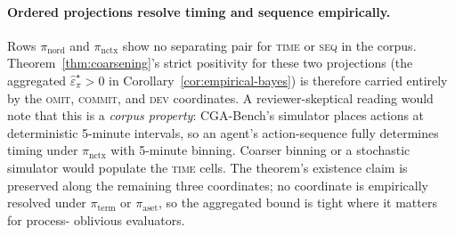 \paragraph{Ordered projections resolve timing and sequence
empirically.} Rows $\pi_{\mathrm{nord}}$ and $\pi_{\mathrm{nctx}}$
show no separating pair for \textsc{time} or \textsc{seq} in the
corpus. Theorem~\ref{thm:coarsening}'s strict positivity for these
two projections (the aggregated $\widehat{\varepsilon}^{\star}_{\pi}>0$
in Corollary~\ref{cor:empirical-bayes}) is therefore carried
entirely by the \textsc{omit}, \textsc{commit}, and \textsc{dev}
coordinates. A reviewer-skeptical reading would note that this is a
\emph{corpus property}: CGA-Bench's simulator places actions at
deterministic 5-minute intervals, so an agent's action-sequence fully
determines timing under $\pi_{\mathrm{nctx}}$ with 5-minute binning.
Coarser binning or a stochastic simulator would populate the
\textsc{time} cells. The theorem's existence claim is preserved
along the remaining three coordinates; no coordinate is empirically
resolved under $\pi_{\mathrm{term}}$ or $\pi_{\mathrm{aset}}$, so
the aggregated bound is tight where it matters for process-
oblivious evaluators.
